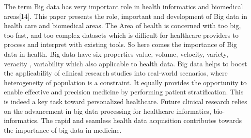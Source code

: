 \documentclass[MTech]{iitmdiss}
\begin{document}
The term Big data has very important role in health informatics and biomedical areas[14]. This paper presents the role, important and development of Big data in health care and biomedical areas. The Area of health is concerned with too big, too fast, and too complex datasets which is difficult  for healthcare providers to process and interpret with existing tools. So here comes the importance of Big data in health. Big data have six properties value, volume, velocity, variety, veracity  , variability which also applicable to health data. Big data helps to boost the applicability of clinical research studies into real-world scenarios, where heterogeneity of population is a constraint. It equally provides the opportunity to enable effective and precision medicine by performing patient stratification. This is indeed a key task toward personalized healthcare. Future clinical research relies on the advancement in big data processing for healthcare informatics, bio-informatics. The rapid and seamless health data acquisition contributes towards the importance of big data in medicine.
\end{document}
